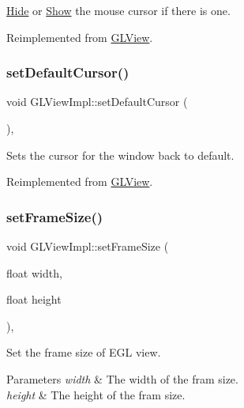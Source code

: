 \hyperlink{classHide}{Hide} or \hyperlink{classShow}{Show} the mouse cursor if there is one. 

Reimplemented from \hyperlink{classGLView_a1d09cf734d01c1a789ded4caef734b2a}{G\+L\+View}.

\mbox{\label{classGLViewImpl_afdb494137883635527117299e81cd78d}} 
\subsubsection{\texorpdfstring{set\+Default\+Cursor()}{setDefaultCursor()}}
{\footnotesize\ttfamily void G\+L\+View\+Impl\+::set\+Default\+Cursor (\begin{DoxyParamCaption}{ }\end{DoxyParamCaption})\hspace{0.3cm}{\ttfamily [override]}, {\ttfamily [virtual]}}

Sets the cursor for the window back to default. 

Reimplemented from \hyperlink{classGLView_a527977ed54ff5ae4ca8a3e2e7a541551}{G\+L\+View}.

\mbox{\label{classGLViewImpl_a73c722d907a4428983a5059aac85af46}} 
\subsubsection{\texorpdfstring{set\+Frame\+Size()}{setFrameSize()}\hspace{0.1cm}{\footnotesize\ttfamily [1/3]}}
{\footnotesize\ttfamily void G\+L\+View\+Impl\+::set\+Frame\+Size (\begin{DoxyParamCaption}\item[{float}]{width,  }\item[{float}]{height }\end{DoxyParamCaption})\hspace{0.3cm}{\ttfamily [override]}, {\ttfamily [virtual]}}

Set the frame size of E\+GL view.


\begin{DoxyParams}{Parameters}
{\em width} & The width of the fram size. \\
\hline
{\em height} & The height of the fram size. \\
\hline
\end{DoxyParams}


